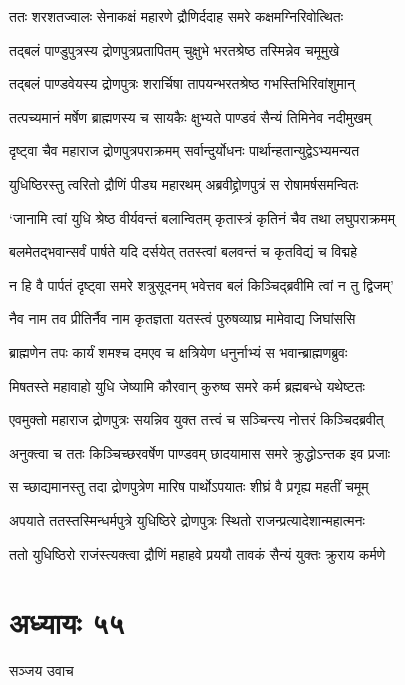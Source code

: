 \twolineshloka
{ततः शरशतज्वालः सेनाकक्षं महारणे}
{द्रौणिर्ददाह समरे कक्षमग्निरिवोत्थितः}


\twolineshloka
{तद्बलं पाण्डुपुत्रस्य द्रोणपुत्रप्रतापितम्}
{चुक्षुभे भरतश्रेष्ठ तस्मिन्नेव चमूमुखे}


\twolineshloka
{तद्बलं पाण्डवेयस्य द्रोणपुत्रः शरार्चिषा}
{तापयन्भरतश्रेष्ठ गभस्तिभिरिवांशुमान्}


\twolineshloka
{तत्पच्यमानं मर्षेण ब्राह्मणस्य च सायकैः}
{क्षुभ्यते पाण्डवं सैन्यं तिमिनेव नदीमुखम्}


\twolineshloka
{दृष्ट्वा चैव महाराज द्रोणपुत्रपराक्रमम्}
{सर्वान्दुर्योधनः पार्थान्हतान्युद्वेऽभ्यमन्यत}


\twolineshloka
{युधिष्ठिरस्तु त्वरितो द्रौणिं पीड्य महारथम्}
{अब्रवीद्द्रोणपुत्रं स रोषामर्षसमन्वितः}


\twolineshloka
{`जानामि त्वां युधि श्रेष्ठ वीर्यवन्तं बलान्वितम्}
{कृतास्त्रं कृतिनं चैव तथा लघुपराक्रमम्}


\twolineshloka
{बलमेतद्भवान्सर्वं पार्षते यदि दर्सयेत्}
{ततस्त्वां बलवन्तं च कृतविद्यं च विद्महे}


\twolineshloka
{न हि वै पार्पतं दृष्ट्वा समरे शत्रुसूदनम्}
{भवेत्तव बलं किञ्चिद्ब्रवीमि त्वां न तु द्विजम्'}


\twolineshloka
{नैव नाम तव प्रीतिर्नैव नाम कृतज्ञता}
{यतस्त्वं पुरुषव्याघ्र मामेवाद्य जिघांससि}


\twolineshloka
{ब्राह्मणेन तपः कार्यं शमश्च दमएव च}
{क्षत्रियेण धनुर्नाभ्यं स भवान्ब्राह्मणब्रुवः}


\twolineshloka
{मिषतस्ते महावाहो युधि जेष्यामि कौरवान्}
{कुरुष्व समरे कर्म ब्रह्मबन्धे यथेष्टतः}


\twolineshloka
{एवमुक्तो महाराज द्रोणपुत्रः सयन्निव}
{युक्त तत्त्वं च सञ्चिन्त्य नोत्तरं किञ्चिदब्रवीत्}


\twolineshloka
{अनुक्त्वा च ततः किञ्चिच्छरवर्षेण पाण्डवम्}
{छादयामास समरे क्रुद्धोऽन्तक इव प्रजाः}


\twolineshloka
{स च्छाद्यमानस्तु तदा द्रोणपुत्रेण मारिष}
{पार्थोऽपयातः शीघ्रं वै प्रगृह्य महतीं चमूम्}


\twolineshloka
{अपयाते ततस्तस्मिन्धर्मपुत्रे युधिष्ठिरे}
{द्रोणपुत्रः स्थितो राजन्प्रत्यादेशान्महात्मनः}


\twolineshloka
{ततो युधिष्ठिरो राजंस्त्यक्त्वा द्रौणिं महाहवे}
{प्रययौ तावकं सैन्यं युक्तः क्रुराय कर्मणे}


\chapter{अध्यायः ५५}
\twolineshloka
{सञ्जय उवाच}
{}


